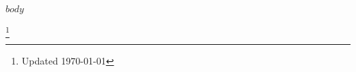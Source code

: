 \documentclass[margin]{res}
\begin{document}
\begin{resume}

  $body$

\end{resume}
\let\thefootnote\relax\footnote{Updated \today}
\end{document}
